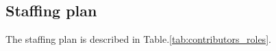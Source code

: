 
\begin{comment}
Our project team structure is specifically crafted to leverage the distinctive skills and capabilities of each team member, fostering effective teamwork. The key roles, responsibilities, and authorities in our project include:

\begin{itemize}
    \item \textbf{Software (SW) Team Lead:} Leads the software team, responsible for overseeing all activities related to software development, ensures that software requirements are met and coordinates with the developers on the software team.
    \item \textbf{Hardware (HW) Team Lead:} Leads the hardware team, responsible for all activities related to hardware development, ensures that hardware requirements are met and coordinates with the developers on the hardware team.
    \item \textbf{Software (SW) Developer:} Implements software components, conducts testing and debugging, and addresses software-related issues.
    \item \textbf{Hardware (HW) Developer:} Designs, tests, and debugs hardware components, addresses hardware-related issues.
\end{itemize}
\end{comment}

\subsection{Staffing plan}

The staffing plan is described in Table.\:\ref{tab:contributors_roles}.


\begin{comment}
Our staffing plan assigns roles to each member of our project team as follows:

\begin{itemize}
    \item Stieg Larsson - Software Team Lead
    \item Astrid Lindgren - Hardware Team Lead
    \item Henning Mankell - Software Developer
    \item Selma Lagerlöf - Hardware Developer
\end{itemize}

Each individual was chosen for their role based on their skills, experience, and interest in the project. Regular meetings will be held to ensure that everyone is on track and to address any concerns that may arise.
\end{comment}

